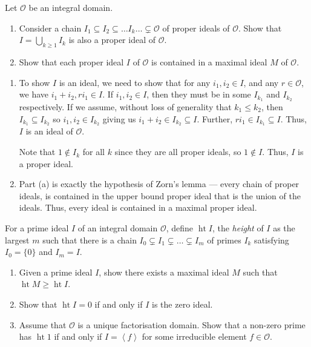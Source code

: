 \documentclass[12 pt, letterpaper]{hmcpset}
\begin{document}
\begin{problem}[Problem 1.]
	Let $\mathcal{O}$ be an integral domain.

	\begin{enumerate}
		\item Consider a chain $I_{1} \subseteq I_{2} \subseteq \dots I_{k} \dots \subsetneq \mathcal{O}$ of proper ideals of $\mathcal{O}$. Show that $I = \bigcup_{k \ge 1} I_{k}$ is also a proper ideal of $\mathcal{O}$.
		\item Show that each proper ideal $I$ of $\mathcal{O}$ is contained in a maximal ideal $M$ of $\mathcal{O}$.
	\end{enumerate} 
\end{problem}

\begin{solution}
	\begin{enumerate}
		\item To show $I$ is an ideal, we need to show that for any $i_{1}, i_{2} \in I$, and any $r \in \mathcal{O}$, we have $i_{1} + i_{2}, r i_{1} \in I$. If $i_{1}, i_{2} \in I$, then they must be in some $I_{k_{1}}$ and $I_{k_{2}}$ respectively. If we assume, without loss of generality that $k_{1} \le k_{2}$, then $I_{k_{1}} \subseteq I_{k_{2}}$ so $i_{1}, i_{2} \in I_{k_{2}}$ giving us $i_{1} + i_{2} \in I_{k_{2}} \subseteq I$. Further, $r i_{1} \in I_{k_{1}} \subseteq I$. Thus, $I$ is an ideal of $\mathcal{O}$.

			Note that $1 \notin I_{k}$ for all $k$ since they are all proper ideals, so $1 \notin I$. Thus, $I$ is a proper ideal.
		\item Part (a) is exactly the hypothesis of Zorn's lemma --- every chain of proper ideals, is contained in the upper bound proper ideal that is the union of the ideals. Thus, every ideal is contained in a maximal proper ideal.
	\end{enumerate}
\end{solution}

\pagebreak

\begin{problem}[Problem 2.]
	For a prime ideal $I$ of an integral domain $\mathcal{O}$, define $\operatorname{ht} I$, the \emph{height} of $I$ as the largest $m$ such that there is a chain $I_{0} \subsetneq I_{1} \subsetneq \dots \subsetneq I_{m}$ of primes $I_{k}$ satisfying $I_{0} = \{ 0 \}$ and $I_{m} = I$.
	\begin{enumerate}
		\item Given a prime ideal $I$, show there exists a maximal ideal $M$ such that $\operatorname{ht} M \ge \operatorname{ht} I$.
		\item Show that $\operatorname{ht} I = 0$ if and only if $I$ is the zero ideal.
		\item Assume that $\mathcal{O}$ is a unique factorisation domain. Show that a non-zero prime has $\operatorname{ht} 1$ if and only if $I = \left < f \right >$ for some irreducible element $f \in \mathcal{O}$.
	\end{enumerate}
\end{problem}
\end{document}
